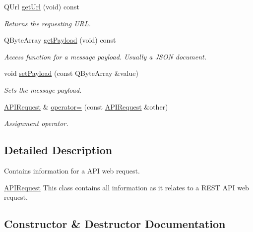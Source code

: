 \begin{DoxyCompactItemize}
Q\+Url \hyperlink{class_a_p_i_request_ab4f5dc1d54250fc927872cfcc59cc3cc}{get\+Url} (void) const
\begin{DoxyCompactList}\small\item\em Returns the requesting U\+RL. \end{DoxyCompactList}\item 
\mbox{\label{class_a_p_i_request_af70046cd59021cc3877f380ca46ac6e7}} 
Q\+Byte\+Array \hyperlink{class_a_p_i_request_af70046cd59021cc3877f380ca46ac6e7}{get\+Payload} (void) const
\begin{DoxyCompactList}\small\item\em Access function for a message payload. Usually a J\+S\+ON document. \end{DoxyCompactList}\item 
\mbox{\label{class_a_p_i_request_a2d16b4ff383297fff242db0b71139c2b}} 
void \hyperlink{class_a_p_i_request_a2d16b4ff383297fff242db0b71139c2b}{set\+Payload} (const Q\+Byte\+Array \&value)
\begin{DoxyCompactList}\small\item\em Sets the message payload. \end{DoxyCompactList}\item 
\mbox{\label{class_a_p_i_request_a5e07ea518a0bb0a750ec8f2d58e9acc5}} 
\hyperlink{class_a_p_i_request}{A\+P\+I\+Request} \& \hyperlink{class_a_p_i_request_a5e07ea518a0bb0a750ec8f2d58e9acc5}{operator=} (const \hyperlink{class_a_p_i_request}{A\+P\+I\+Request} \&other)
\begin{DoxyCompactList}\small\item\em Assignment operator. \end{DoxyCompactList}\end{DoxyCompactItemize}


\subsection{Detailed Description}
Contains information for a A\+PI web request. 

\hyperlink{class_a_p_i_request}{A\+P\+I\+Request} This class contains all information as it relates to a R\+E\+ST A\+PI web request. 

\subsection{Constructor \& Destructor Documentation}
\mbox{\label{class_a_p_i_request_a5c6b7f4e52cf0d36bd3bb2280ab59331}} 
